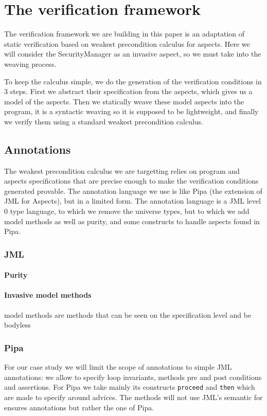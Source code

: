 \documentclass[draft]{llncs}
\begin{document}
\section{The verification framework}
The verification framework we are building in this paper is an adaptation of static
verification based on weakest precondition calculus for aspects. Here we will consider
the SecurityManager as an invasive aspect, so we must take into the weaving process.

To keep the calculus simple, we do the generation of the verification conditions in 3 steps.
First we abstract their specification from the aspects, which gives us a model of the aspects.
Then we statically weave these model aspects into the program, it is a syntactic weaving so
it is supposed to be lightweight, and finally we verify them
using a standard weakest precondition calculus.

\subsection{Annotations}
The weakest precondition calculus we are targetting relies on program and aspects specifications that are
precise enough to make the verification conditions generated provable.
The annotation language we use is like Pipa (the extension
of JML for Aspects), but in a limited form. The annotation language is a JML level 0 type language, to which
we remove the universe types, but to which we add model methods as well as purity, and some constructs
to handle aspects found in Pipa.

\subsubsection{JML}
\paragraph{Purity}

\paragraph{Invasive model methods} model methods are methods that can be seen on the specification
level and be bodyless

\subsubsection{Pipa}
 For our case study we will limit the scope of annotations
to simple JML annotations: we allow to specify loop invariants, methods pre and post conditions
and assertions. For Pipa we take mainly its constructs {\tt proceed} and {\tt then} which are made to
specify around advices.
The methods will not use JML's semantic for ensures annotations but rather the one of Pipa.
\end{document}
